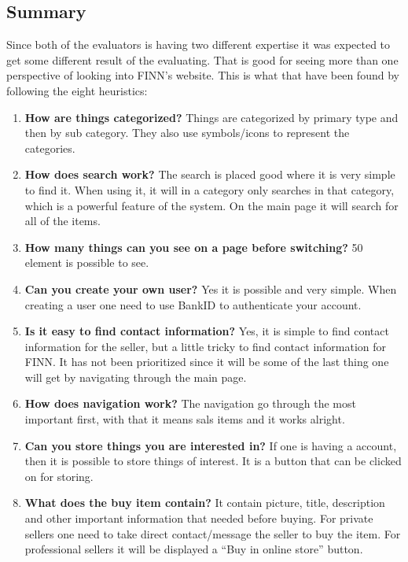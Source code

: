 \subsection{Summary}
Since both of the evaluators is having two different expertise it was expected to get some different result of the evaluating. That is good for seeing more than one perspective of looking into FINN’s website. This is what that have been found by following the eight heuristics: 
\begin{enumerate}
  \item \textbf{How are things categorized?} Things are categorized by primary type and then by sub category. They also use symbols/icons to represent the categories. 
  \item \textbf{How does search work?} The search is placed good where it is very simple
to find it. When using it, it will in a category only searches in that category, which is a powerful feature of the system. On the main page it will search for all of the items. 

  \item \textbf{How many things can you see on a page before switching?} 50 element is possible to see. 
  \item \textbf{Can you create your own user?} Yes it is possible and very simple. When creating a user one need to use BankID to authenticate your account.
  \item \textbf{Is it easy to find contact information?} Yes, it is simple to find contact information for the seller, but a little tricky to find contact information for FINN. It has not been prioritized since it will be some of the last thing one will get by navigating through the main page. 
  \item \textbf{How does navigation work?} The navigation go through the most important first, with that it means sals items and it works alright. 
  \item \textbf{Can you store things you are interested in?} If one is having a account, then it is possible to store things of interest. It is a button that can be clicked on for storing. 
  \item \textbf{What does the buy item contain?} It contain picture, title, description and other important information that needed before buying. For private sellers one need to take direct contact/message the seller to buy the item. For professional sellers it will be displayed a “Buy in online store” button.
 \end{enumerate}

